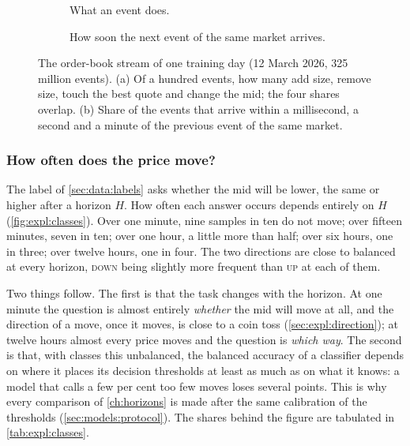 \begin{figure}[t]
\centering
\begin{subfigure}[t]{0.5\textwidth}\centering\caption{What an event does.}\end{subfigure}%
\begin{subfigure}[t]{0.5\textwidth}\centering\caption{How soon the next event of the same market arrives.}\end{subfigure}
\caption{The order-book stream of one training day (12 March 2026, 325 million events).
(a) Of a hundred events, how many add size, remove size, touch the best quote and change
the mid; the four shares overlap.  (b) Share of the events that arrive within a
millisecond, a second and a minute of the previous event of the same market.}
\label{fig:expl:stream}
\end{figure}

\subsubsection{How often does the price move?}
\label{sec:expl:classes}

The label of \cref{sec:data:labels} asks whether the mid will be lower, the same or higher
after a horizon $H$.  How often each answer occurs depends entirely on $H$
(\cref{fig:expl:classes}).  Over one minute, nine samples in ten do not move; over fifteen
minutes, seven in ten; over one hour, a little more than half; over six hours, one in three; over
twelve hours, one in four.  The two directions are close to balanced at every horizon,
\textsc{down} being slightly more frequent than \textsc{up} at each of them.

Two things follow.  The first is that the task changes with the horizon.  At one minute
the question is almost entirely \emph{whether} the mid will move at all, and the direction
of a move, once it moves, is close to a coin toss (\cref{sec:expl:direction}); at twelve
hours almost every price moves and the question is \emph{which way}.  The second is that,
with classes this unbalanced, the balanced accuracy of a classifier depends on where it
places its decision thresholds at least as much as on what it knows: a model that calls a
few per cent too few moves loses several points.  This is why every comparison of
\cref{ch:horizons} is made after the same calibration of the thresholds
(\cref{sec:models:protocol}).  The shares behind the figure are tabulated in
\cref{tab:expl:classes}.

